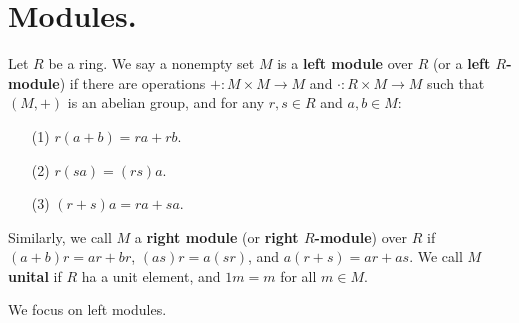
\section{Modules.}
\label{section1}

\begin{definition}
    Let $R$ be a ring. We say a nonempty set $M$ is a \textbf{left module} over $R$  (or a
    \textbf{left $R$-module}) if there are operations $+:M \times M \rightarrow M$ and $\cdot:R
    \times M \rightarrow M$ such that $(M,+)$ is an abelian group, and for any $r,s \in R$ and $a,b
    \in M$:
        \begin{enumerate}
            \item[(1)] $r(a+b)=ra+rb$.

            \item[(2)] $r(sa)=(rs)a$.

            \item[(3)] $(r+s)a=ra+sa$.
        \end{enumerate}
        Similarly, we call $M$ a \textbf{right module} (or \textbf{right $R$-module}) over $R$ if
        $(a+b)r=ar+br$, $(as)r=a(sr)$, and $a(r+s)=ar+as$.
    We call $M$  \textbf{unital} if $R$ ha a unit element, and  $1m=m$ for all  $m \in M$.
\end{definition}

We focus on left modules.

